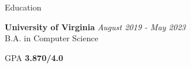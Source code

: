 \documentclass{resume}
\begin{document}

\begin{rSection}{Education}

    {\bf University of Virginia} \hfill {\em August 2019 - May 2023} \\ 
    B.A. in Computer Science

    GPA {\bf3.870/4.0}

\end{rSection}

\end{document}
